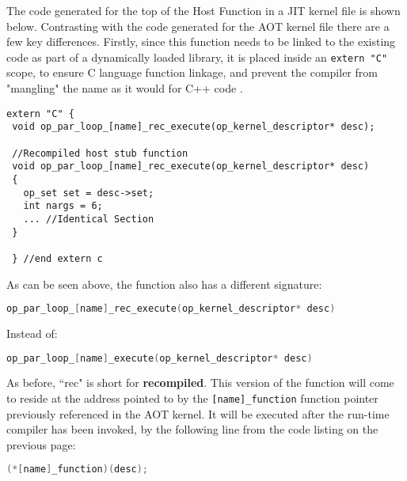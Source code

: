 The code generated for the top of the Host Function in a JIT kernel file is shown below. Contrasting with the code generated for the AOT kernel file there are a few key differences. Firstly, since this function needs to be linked to the existing code as part of a dynamically loaded library, it is placed inside an \verb|extern "C"| scope, to ensure C language function linkage, and prevent the compiler from "mangling" the name as it would for C++ code \cite{linkage}.

\begin{lstlisting}[linewidth = \textwidth, framesep=0pt, linebackgroundcolor={\ifnum\value{lstnumber}<10 \ifnum\value{lstnumber}>6 \color{red!20} \else \color{green!20} \fi \else \color{green!20} \fi}]
 extern "C" {
 void op_par_loop_[name]_rec_execute(op_kernel_descriptor* desc);

 //Recompiled host stub function
 void op_par_loop_[name]_rec_execute(op_kernel_descriptor* desc)
 {
   op_set set = desc->set;
   int nargs = 6;
   ... //Identical Section
 }

 } //end extern c
\end{lstlisting}


\noindent As can be seen above, the function also has a different signature:\vspace{1em}
\begin{lstlisting}[backgroundcolor=\color{green!20}, language=C]
op_par_loop_[name]_rec_execute(op_kernel_descriptor* desc)
\end{lstlisting}
\vspace{-1em}
Instead of:
\vspace{.5em}
\begin{lstlisting}[backgroundcolor=\color{blue!20}, language=C]
op_par_loop_[name]_execute(op_kernel_descriptor* desc)
\end{lstlisting}
As before, ``rec" is short for \textbf{recompiled}. This version of the function will come to reside at the address pointed to by the \verb|[name]_function| function pointer previously referenced in the AOT kernel. It will be executed after the run-time compiler has been invoked, by the following line from the code listing on the previous page:

\begin{lstlisting}[backgroundcolor=\color{blue!20}, language=C]
     (*[name]_function)(desc);
\end{lstlisting}

